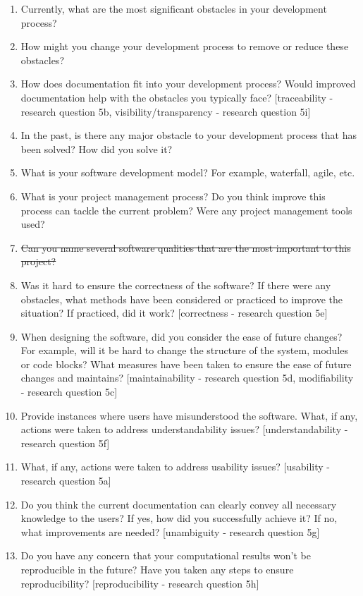 \documentclass[12pt]{article}
\begin{document}
\begin{enumerate}
\item Currently, what are the most significant obstacles in your development
process?
\item How might you change your development process to remove or reduce these
obstacles?
\item How does documentation fit into your development process? Would improved
documentation help with the obstacles you typically face? [traceability - research question 5b, visibility/transparency - research question 5i]
\item In the past, is there any major obstacle to your development process that
has been solved? How did you solve it?
\item What is your software development model? For example, waterfall, agile, etc.
\item What is your project management process? Do you think improve this process
can tackle the current problem? Were any project management tools used?
\item \sout{Can you name several software qualities that are the most important to
this project?}
\item Was it hard to ensure the correctness of the software? If there were any
 obstacles, what methods have been considered or practiced to improve the situation? If practiced, did it work? [correctness - research question 5e]
\item When designing the software, did you consider the ease of future changes?
 For example, will it be hard to change the structure of the system, modules or code blocks? What measures have been taken to ensure the ease of future changes and maintains? [maintainability - research question 5d, modifiability - research question 5c]
\item Provide instances where users have misunderstood the software. What, if any, actions were taken to address understandability issues? [understandability - research question 5f]
\item What, if any, actions were taken to address usability issues? [usability - research question 5a]
\item Do you think the current documentation can clearly convey all necessary
knowledge to the users? If yes, how did you successfully achieve it? If no, what
improvements are needed? [unambiguity - research question 5g]
\item Do you have any concern that your computational results won't be
reproducible in the future? Have you taken any steps to ensure reproducibility? [reproducibility - research question 5h]
\end{enumerate}
\end{document}
